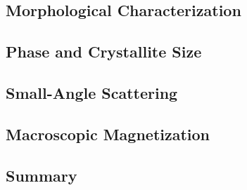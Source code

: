 \documentclass[\main/dresen_thesis.tex]{subfiles}
\renewcommand{\thisPath}{\main/chapters/colloidalCrystals/nanoparticles/}
\begin{document}
  \subsection{Morphological Characterization}
    
      \FloatBarrier

  \subsection{Phase and Crystallite Size}
    
      \FloatBarrier

  \subsection{Small-Angle Scattering}
    
      \FloatBarrier

  \subsection{Macroscopic Magnetization}
    
      \FloatBarrier

  \clearpage
  \subsection{Summary}
  
    \FloatBarrier
\end{document}

